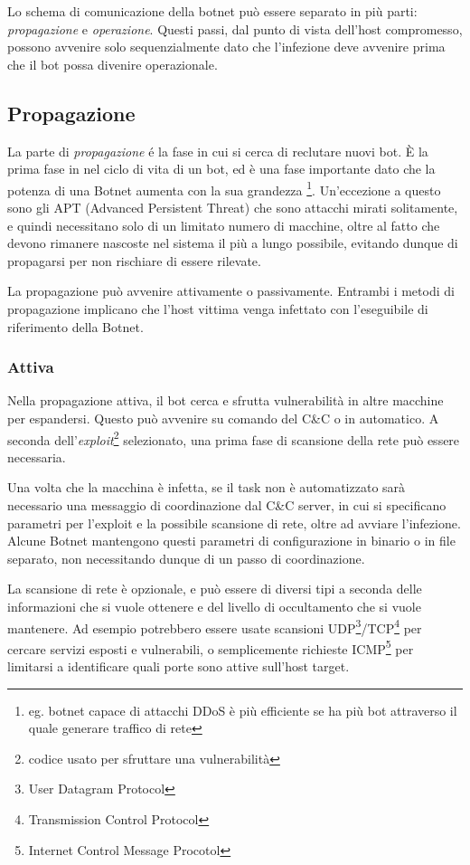 Lo schema di comunicazione della botnet può essere separato in più parti: \emph{propagazione} e \emph{operazione}. Questi passi, dal punto di vista dell'host compromesso, possono avvenire solo sequenzialmente dato che l'infezione deve avvenire prima che il bot possa divenire operazionale. 
\subsection{Propagazione}
La parte di \emph{propagazione} é la fase in cui si cerca di reclutare nuovi bot. È la prima fase in nel ciclo di vita di un bot, ed è una fase importante dato che la potenza di una Botnet aumenta con la sua grandezza \footnote{eg. botnet capace di attacchi DDoS è più efficiente se ha più bot attraverso il quale generare traffico di rete}. Un'eccezione a questo sono gli APT (Advanced Persistent Threat) che sono attacchi mirati solitamente, e quindi necessitano solo di un limitato numero di macchine, oltre al fatto che devono rimanere nascoste nel sistema il più a lungo possibile, evitando dunque di propagarsi per non rischiare di essere rilevate.

La propagazione può avvenire attivamente o passivamente.
Entrambi i metodi di propagazione implicano che l'host vittima venga infettato con l'eseguibile di riferimento della  Botnet. 
\subsubsection{Attiva}
\label{PropagazioneAttiva}
Nella propagazione attiva, il bot cerca e sfrutta vulnerabilità in altre macchine per espandersi. Questo può avvenire su comando del C\&C o in automatico. A seconda dell'\textit{exploit}\footnote{codice usato per sfruttare una vulnerabilità} selezionato, una prima fase di scansione della rete può essere necessaria.


Una volta che la macchina è infetta, se il task non è automatizzato sarà necessario una messaggio di coordinazione dal C\&C server, in cui si specificano parametri per l'exploit e la possibile scansione di rete, oltre ad avviare l'infezione. Alcune Botnet mantengono questi parametri di configurazione in binario o in file separato, non necessitando dunque di un passo di coordinazione. 

La scansione di rete è opzionale, e può essere di diversi tipi a seconda delle informazioni che si vuole ottenere e del livello di occultamento che si vuole mantenere. Ad esempio potrebbero essere usate scansioni UDP\footnote{User Datagram Protocol}/TCP\footnote{Transmission Control Protocol} per cercare servizi esposti e vulnerabili, o semplicemente richieste ICMP\footnote{Internet Control Message Procotol} per limitarsi a identificare quali porte sono attive sull'host target.



